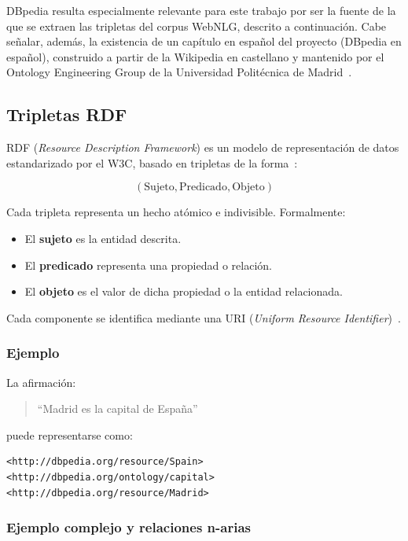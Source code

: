 DBpedia resulta especialmente relevante para este trabajo por ser la fuente de
la que se extraen las tripletas del corpus WebNLG, descrito a continuación.
Cabe señalar, además, la existencia de un capítulo en español del proyecto
(DBpedia en español), construido a partir de la Wikipedia en castellano y
mantenido por el Ontology Engineering Group de la Universidad Politécnica de
Madrid~\cite{DBpediaSpanish}.

\subsection{Tripletas RDF}

RDF (\textit{Resource Description Framework}) es un modelo de representación de
datos estandarizado por el W3C, basado en tripletas de la
forma~\cite{W3CRDF11}:

\[
	(\text{Sujeto}, \text{Predicado}, \text{Objeto})
\]

Cada tripleta representa un hecho atómico e indivisible. Formalmente:

\begin{itemize}
	\item El \textbf{sujeto} es la entidad descrita.
	\item El \textbf{predicado} representa una propiedad o relación.
	\item El \textbf{objeto} es el valor de dicha propiedad o la entidad relacionada.
\end{itemize}

Cada componente se identifica mediante una URI (\textit{Uniform Resource
	Identifier})~\cite{W3CRDF11}.

\subsubsection{Ejemplo}

La afirmación:

\begin{quote}
	``Madrid es la capital de España''
\end{quote}

puede representarse como:

\begin{verbatim}
<http://dbpedia.org/resource/Spain>
<http://dbpedia.org/ontology/capital>
<http://dbpedia.org/resource/Madrid>
\end{verbatim}

\subsubsection{Ejemplo complejo y relaciones n-arias}

